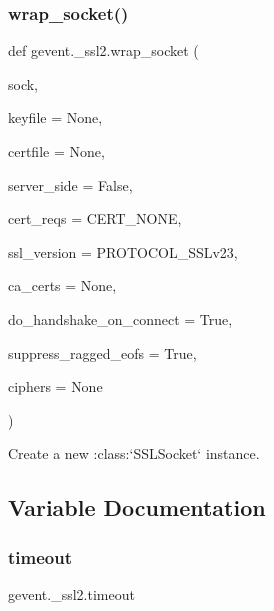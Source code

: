 \subsubsection{\texorpdfstring{wrap\+\_\+socket()}{wrap\_socket()}}
{\footnotesize\ttfamily def gevent.\+\_\+ssl2.\+wrap\+\_\+socket (\begin{DoxyParamCaption}\item[{}]{sock,  }\item[{}]{keyfile = {\ttfamily None},  }\item[{}]{certfile = {\ttfamily None},  }\item[{}]{server\+\_\+side = {\ttfamily False},  }\item[{}]{cert\+\_\+reqs = {\ttfamily CERT\+\_\+NONE},  }\item[{}]{ssl\+\_\+version = {\ttfamily PROTOCOL\+\_\+SSLv23},  }\item[{}]{ca\+\_\+certs = {\ttfamily None},  }\item[{}]{do\+\_\+handshake\+\_\+on\+\_\+connect = {\ttfamily True},  }\item[{}]{suppress\+\_\+ragged\+\_\+eofs = {\ttfamily True},  }\item[{}]{ciphers = {\ttfamily None} }\end{DoxyParamCaption})}

\begin{DoxyVerb}Create a new :class:`SSLSocket` instance.\end{DoxyVerb}
 

\subsection{Variable Documentation}
\mbox{\label{namespacegevent_1_1__ssl2_ac56a33594c8daf3628f92051f1cf0c53}} 
\subsubsection{\texorpdfstring{timeout}{timeout}}
{\footnotesize\ttfamily gevent.\+\_\+ssl2.\+timeout}

